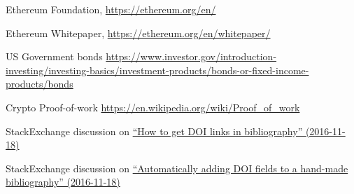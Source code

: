 \documentclass[a4paper,onecolumn, superscriptaddress,10pt,accepted=2020-05-01,issue=1, volume=2, shorttitle=papers]{compositionalityarticle}
\begin{document}

\begin{thebibliography}{9}
  Ethereum Foundation,
  \href{https://ethereum.org/en/}{https://ethereum.org/en/}

  Ethereum Whitepaper,
  \href{https://ethereum.org/en/whitepaper/}{https://ethereum.org/en/whitepaper/}

  US Government bonds 
  \href{https://www.investor.gov/introduction-investing/investing-basics/investment-products/bonds-or-fixed-income-products/bonds}{https://www.investor.gov/introduction-investing/investing-basics/investment-products/bonds-or-fixed-income-products/bonds}

  Crypto Proof-of-work 
  \href{https://en.wikipedia.org/wiki/Proof_of_work}{https://en.wikipedia.org/wiki/Proof_of_work}

  StackExchange discussion on \href{http://tex.stackexchange.com/questions/3802/how-to-get-doi-links-in-bibliography}{``How to get DOI links in bibliography'' (2016-11-18)}
  
  StackExchange discussion on \href{http://tex.stackexchange.com/questions/6810/automatically-adding-doi-fields-to-a-hand-made-bibliography}{``Automatically adding DOI fields to a hand-made bibliography'' (2016-11-18)}

\end{thebibliography}



\onecolumn\newpage
\end{document}
